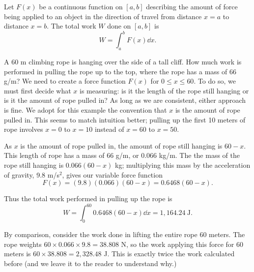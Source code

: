 \begin{keyidea}[Work]\label{idea:work}
Let $F(x)$ be a continuous function on $[a,b]$ describing the amount of force being applied to an object in the direction of travel from distance $x=a$ to distance $x=b$. The total work $W$ done on $[a,b]$ is
\[W = \int_a^b F(x)\dd x.\]
\end{keyidea}


\begin{example}\label{ex_work1}
A 60 m climbing rope is hanging over the side of a tall cliff. How much work is performed in pulling the rope up to the top, where the rope has a mass of 66 g/m? 
\solution
We need to create a force function $F(x)$ for $0\le x\le60$. To do so, we must first decide what $x$ is measuring: is it the length of the rope still hanging or is it the amount of rope pulled in? As long as we are consistent, either approach is fine. We adopt for this example the convention that $x$ is the amount of rope pulled in. This seems to match intuition better; pulling up the first 10 meters of rope involves $x=0$ to $x=10$ instead of $x=60$ to $x=50$. 

As $x$ is the amount of rope pulled in, the amount of rope still hanging is $60-x$. This length of rope has a mass of 66 g/m, or $0.066$ kg/m. The the mass of the rope still hanging is $0.066(60-x)$ kg; multiplying this mass by the acceleration of gravity, 9.8 m/s$^2$, gives our variable force function
\[F(x) = (9.8)(0.066)(60-x) = 0.6468(60-x).\]

Thus the total work performed in pulling up the rope is 
\[W = \int_0^{60} 0.6468(60-x)\dd x = 1,164.24\ \text{J}.\]

By comparison, consider the work done in lifting the entire rope 60 meters. The rope weights $60\times 0.066 \times 9.8 = 38.808$ N, so the work applying this force for 60 meters is $60\times 38.808 = 2,328.48$ J. This is exactly twice the work calculated before (and we leave it to the reader to understand why.)
\end{example}

